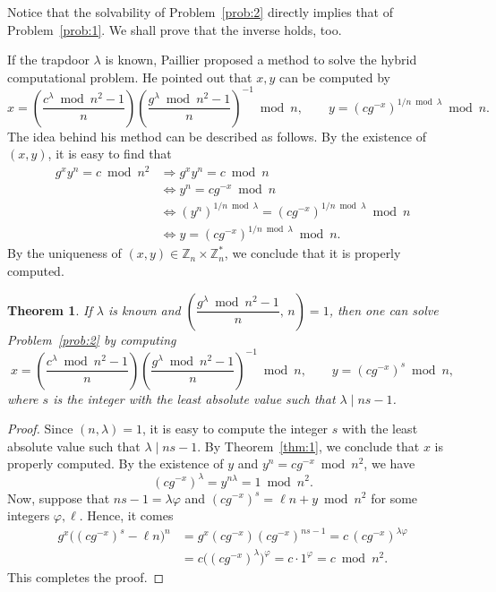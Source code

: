 \documentclass[11pt,a4paper]{article}
\newtheorem{theorem}[definition]{Theorem}
\theoremstyle{remark}
\newcommand{\Z}{\mathbb{Z}}
\begin{document}
Notice that the solvability of Problem~\ref{prob:2} directly implies that of Problem~\ref{prob:1}. We shall prove that the inverse holds, too.

If the trapdoor $\lambda$ is known, Paillier proposed a method to solve the hybrid computational problem. He pointed out that $x,y$ can be computed by
\[
x = \left(\frac{c^\lambda \bmod n^2 - 1}{n}\right)\left(\frac{g^\lambda \bmod n^2 - 1}{n}\right)^{-1} \bmod n, \qquad
y = (cg^{-x})^{1/n \bmod \lambda} \bmod n.
\]
The idea behind his method can be described as follows. By the existence of $(x,y)$, it is easy to find that
\begin{align*}
g^x y^n = c \bmod n^2 &\Longrightarrow g^x y^n = c \bmod n \\
&\Longleftrightarrow y^n = cg^{-x} \bmod n\\
&\Longleftrightarrow (y^n)^{1/n \bmod \lambda} = (cg^{-x})^{1/n \bmod \lambda} \bmod n\\
&\Longleftrightarrow y = (cg^{-x})^{1/n \bmod \lambda} \bmod n.
\end{align*}
By the uniqueness of $(x,y)\in\Z_n\times\Z_n^*$, we conclude that it is properly computed.

\begin{theorem}\label{thm:2}
If $\lambda$ is known and $\left(\dfrac{g^\lambda \bmod n^2 - 1}{n},\, n\right)=1$, then one can solve Problem~\ref{prob:2} by computing
\[
x = \left(\frac{c^\lambda \bmod n^2 - 1}{n}\right)\left(\frac{g^\lambda \bmod n^2 - 1}{n}\right)^{-1} \bmod n, \qquad
y = (cg^{-x})^s \bmod n,
\]
where $s$ is the integer with the least absolute value such that $\lambda \mid ns-1$.
\end{theorem}

\begin{proof}
Since $(n,\lambda)=1$, it is easy to compute the integer $s$ with the least absolute value such that $\lambda\mid ns-1$. By Theorem~\ref{thm:1}, we conclude that $x$ is properly computed. By the existence of $y$ and $y^n = cg^{-x} \bmod n^2$, we have
\[
(cg^{-x})^\lambda = y^{n\lambda} = 1 \bmod n^2.
\]
Now, suppose that $ns-1 = \lambda\varphi$ and $(cg^{-x})^s = \ell n + y \bmod n^2$ for some integers $\varphi,\ell$. Hence, it comes
\begin{align*}
g^x\big((cg^{-x})^s - \ell n\big)^n
&= g^x (cg^{-x})(cg^{-x})^{ns-1}
 = c\,(cg^{-x})^{\lambda\varphi}\\
&= c\big((cg^{-x})^{\lambda}\big)^{\varphi}
 = c\cdot 1^{\varphi} = c \bmod n^2.
\end{align*}
This completes the proof.
\end{proof}
\end{document}
